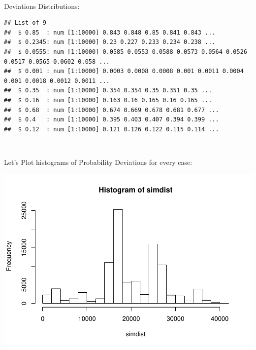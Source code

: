 \documentclass[]{article}
\newenvironment{Shaded}{\begin{snugshade}}{\end{snugshade}}
\newcommand{\DataTypeTok}[1]{\textcolor[rgb]{0.13,0.29,0.53}{#1}}
\newcommand{\DecValTok}[1]{\textcolor[rgb]{0.00,0.00,0.81}{#1}}
\newcommand{\KeywordTok}[1]{\textcolor[rgb]{0.13,0.29,0.53}{\textbf{#1}}}
\newcommand{\NormalTok}[1]{#1}
\newcommand{\OperatorTok}[1]{\textcolor[rgb]{0.81,0.36,0.00}{\textbf{#1}}}
\newcommand{\StringTok}[1]{\textcolor[rgb]{0.31,0.60,0.02}{#1}}
\begin{document}
~

Deviations Distributions:

\begin{Shaded}
\end{Shaded}

\begin{verbatim}
## List of 9
##  $ 0.85  : num [1:10000] 0.843 0.848 0.85 0.841 0.843 ...
##  $ 0.2345: num [1:10000] 0.23 0.227 0.233 0.234 0.238 ...
##  $ 0.0555: num [1:10000] 0.0585 0.0553 0.0588 0.0573 0.0564 0.0526 0.0517 0.0565 0.0602 0.058 ...
##  $ 0.001 : num [1:10000] 0.0003 0.0008 0.0008 0.001 0.0011 0.0004 0.001 0.0018 0.0012 0.0011 ...
##  $ 0.35  : num [1:10000] 0.354 0.354 0.35 0.351 0.35 ...
##  $ 0.16  : num [1:10000] 0.163 0.16 0.165 0.16 0.165 ...
##  $ 0.68  : num [1:10000] 0.674 0.669 0.678 0.681 0.677 ...
##  $ 0.4   : num [1:10000] 0.395 0.403 0.407 0.394 0.399 ...
##  $ 0.12  : num [1:10000] 0.121 0.126 0.122 0.115 0.114 ...
\end{verbatim}

~

Let's Plot histograms of Probability Deviations for every case:

\includegraphics{pvalDist_files/figure-latex/unnamed-chunk-11-1.pdf}

\newpage
\end{document}

